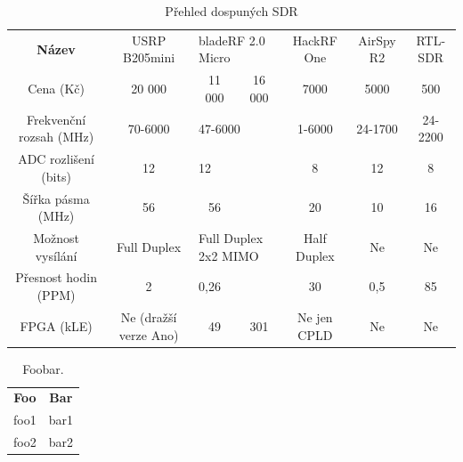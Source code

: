 \documentclass{ctuthesis}
\begin{document}
\begin{table}
\begin{ctucolortab}
\begin{tabular}{c|cccccc}
\bfseries
Název                   & USRP B205mini         & \multicolumn{2}{l}{bladeRF 2.0 Micro}    & HackRF One  & AirSpy R2 & RTL-SDR \\ \Midrule
Cena (Kč)               & 20 000                & 11 000              & 16 000             & 7000        & 5000      & 500     \\
Frekvenční rozsah (MHz) & 70-6000               & \multicolumn{2}{l}{47-6000}              & 1-6000      & 24-1700   & 24-2200 \\
ADC rozlišení (bits)    & 12                    & \multicolumn{2}{l}{12}                   & 8           & 12        & 8       \\
Šířka pásma (MHz)       & 56                    & 56                  &                    & 20          & 10        & 16      \\
Možnost vysílání        & Full Duplex           & \multicolumn{2}{l}{Full Duplex 2x2 MIMO} & Half Duplex & Ne        & Ne      \\
Přesnost hodin (PPM)    & 2                     & \multicolumn{2}{l}{0,26}                 & 30          & 0,5       & 85      \\
FPGA (kLE)              & Ne (dražší verze Ano) & 49                  & 301                & Ne jen CPLD & Ne        & Ne      \\ 
\end{tabular}
\end{ctucolortab}
\caption{Přehled dospuných SDR}
\label{tab:sdr}
\cite{https://kb.ettus.com/B200/B210/B200mini/B205mini, https://www.rtl-sdr.com/review-airspy-vs-sdrplay-rsp-vs-hackrf/, https://www.itead.cc/airspy.html, http://www.taylorkillian.com/2013/08/sdr-showdown-hackrf-vs-bladerf-vs-usrp.html}
\end{table}

\begin{table}
\begin{ctucolortab}
\begin{tabular}{cc}
\bfseries Foo & \bfseries Bar \\\Midrule
foo1 & bar1 \\
foo2 & bar2
\end{tabular}
\end{ctucolortab}
\caption{Foobar.}
\label{tab:foobar}
\end{table}
\end{document}
